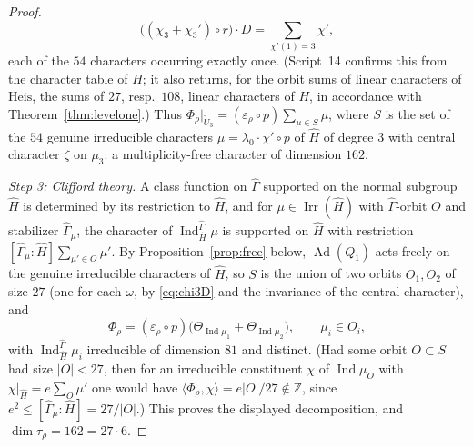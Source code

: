\documentclass[11pt]{article}
\newcommand{\Z}{\mathbb Z}
\newcommand{\Irr}{\operatorname{Irr}}
\newcommand{\Ind}{\operatorname{Ind}}
\newcommand{\Ad}{\operatorname{Ad}}
\newcommand{\tU}{\widetilde U}
\theoremstyle{plain}
\theoremstyle{definition}
\begin{document}
\begin{proof}
\begin{equation}
 \bigl((\chi_3+\chi_3')\circ r\bigr)\cdot D=\sum_{\chi'(1)=3}\chi' ,
\end{equation}
each of the $54$ characters occurring exactly once.  (Script~14
confirms this from the character table of $H$; it also returns, for the
orbit sums of linear characters of $\mathrm{Heis}$, the sums of $27$,
resp.\ $108$, linear characters of $H$, in accordance with
Theorem~\ref{thm:levelone}.)  Thus
$\Phi_\rho|_{\tU_3}=(\varepsilon_\rho\circ p)\sum_{\mu\in S}\mu$, where
$S$ is the set of the $54$ genuine irreducible characters
$\mu=\lambda_0\cdot\chi'\circ p$ of $\hat H$ of degree $3$ with central
character $\zeta$ on $\mu_3$: a multiplicity-free character of
dimension $162$.

\emph{Step 3: Clifford theory.}  A class function on $\hat\Gamma$
supported on the normal subgroup $\hat H$ is determined by its
restriction to $\hat H$, and for $\mu\in\Irr(\hat H)$ with
$\hat\Gamma$-orbit $O$ and stabilizer $\hat\Gamma_\mu$, the character of
$\Ind_{\hat H}^{\hat\Gamma}\mu$ is supported on $\hat H$ with restriction
$[\hat\Gamma_\mu:\hat H]\sum_{\mu'\in O}\mu'$.  By
Proposition~\ref{prop:free} below, $\Ad(Q_1)$ acts freely on the genuine
irreducible characters of $\hat H$, so $S$ is the union of two orbits
$O_1,O_2$ of size $27$ (one for each $\omega$, by \eqref{eq:chi3D} and
the invariance of the central character), and
\[
 \Phi_\rho=(\varepsilon_\rho\circ p)\bigl(\Theta_{\Ind\mu_1}+\Theta_{\Ind\mu_2}\bigr),\qquad \mu_i\in O_i ,
\]
with $\Ind_{\hat H}^{\hat\Gamma}\mu_i$ irreducible of dimension $81$ and
distinct.  (Had some orbit $O\subset S$ had size $|O|<27$, then for an
irreducible constituent $\chi$ of $\Ind\mu_O$ with
$\chi|_{\hat H}=e\sum_O\mu'$ one would have
$\langle\Phi_\rho,\chi\rangle=e|O|/27\notin\Z$, since
$e^2\le[\hat\Gamma_\mu:\hat H]=27/|O|$.)  This proves the displayed
decomposition, and $\dim\tau_\rho=162=27\cdot6$.
\end{proof}
\end{document}
